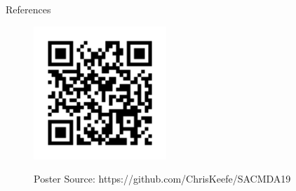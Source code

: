 \documentclass[final]{beamer}
\newlength{\sepwidth}
\newlength{\colwidth}
\newcommand{\separatorcolumn}{\begin{column}{\sepwidth}\end{column}}
\begin{document}
\begin{frame}[t]
\begin{columns}[t]
\begin{column}{\colwidth}
  \begin{block}{References}
    \nocite{*}
    
  \end{block}

  \begin{figure}
    \begin{minipage}[c]{\textwidth}
      \hfill
      \includegraphics[height=5cm]{assets/repo}
    \end{minipage}
    \begin{minipage}[c]{\textwidth}
      \hfill
      Poster Source: https://github.com/ChrisKeefe/SACMDA19
    \end{minipage}
  \end{figure}

\end{column}

\separatorcolumn
\end{columns}
\end{frame}
\end{document}

